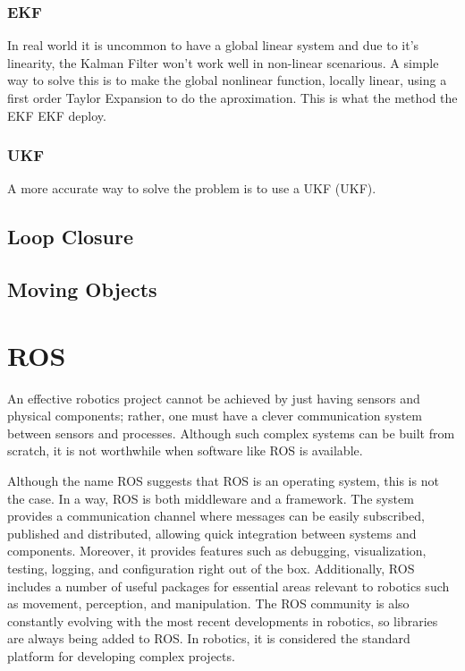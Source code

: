 \subsubsection{\acl{EKF}}

In real world it is uncommon to have a global linear system and due to it's linearity, the Kalman Filter won't work well in non-linear scenarious. A simple way to solve this is to make the global nonlinear function, locally linear, using a first order Taylor Expansion to do the aproximation. This is what the method the \acl{EKF} \acs*{EKF} deploy.

\subsubsection*{\acl*{UKF}}



 A more accurate way to solve the problem is to use a \acl*{UKF} (\acs*{UKF}).


\subsection{Loop Closure}

\subsection{Moving Objects}

\section{\acs{ROS}}

An effective robotics project cannot be achieved by just having sensors and physical components; rather, one must have a clever communication system between sensors and processes. Although such complex systems can be built from scratch, it is not worthwhile when software like \acs*{ROS} is available.

Although the name \acl*{ROS} suggests that ROS is an operating system, this is not the case.  In a way, \acs*{ROS} is both middleware and a framework. The system provides a communication channel where messages can be easily subscribed, published and distributed, allowing quick integration between systems and components. Moreover, it provides features such as debugging, visualization, testing, logging, and configuration right out of the box. Additionally, ROS includes a number of useful packages for essential areas relevant to robotics such as movement, perception, and manipulation. The ROS community is also constantly evolving with the most recent developments in robotics, so libraries are always being added to ROS. In robotics, it is considered the standard platform for developing complex projects.
